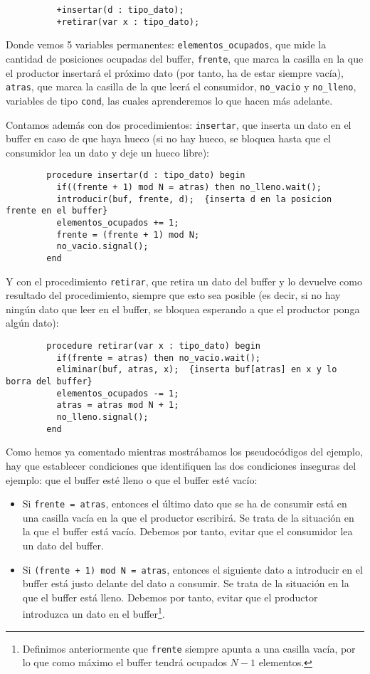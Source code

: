 \begin{ejemplo}
\begin{verbatim}
          +insertar(d : tipo_dato);
          +retirar(var x : tipo_dato);
    \end{verbatim}
    Donde vemos 5 variables permanentes: \verb|elementos_ocupados|, que mide la cantidad de posiciones ocupadas del buffer, \verb|frente|, que marca la casilla en la que el productor insertará el próximo dato (por tanto, ha de estar siempre vacía), \verb|atras|, que marca la casilla de la que leerá el consumidor, \verb|no_vacio| y \verb|no_lleno|, variables de tipo \verb|cond|, las cuales aprenderemos lo que hacen más adelante.
    
    Contamos además con dos procedimientos: \verb|insertar|, que inserta un dato en el buffer en caso de que haya hueco (si no hay hueco, se bloquea hasta que el consumidor lea un dato y deje un hueco libre):
    \begin{verbatim}
        procedure insertar(d : tipo_dato) begin
          if((frente + 1) mod N = atras) then no_lleno.wait();
          introducir(buf, frente, d);  {inserta d en la posicion frente en el buffer}
          elementos_ocupados += 1;
          frente = (frente + 1) mod N;
          no_vacio.signal();
        end
    \end{verbatim}
    Y con el procedimiento \verb|retirar|, que retira un dato del buffer y lo devuelve como resultado del procedimiento, siempre que esto sea posible (es decir, si no hay ningún dato que leer en el buffer, se bloquea esperando a que el productor ponga algún dato):
    \begin{verbatim}
        procedure retirar(var x : tipo_dato) begin
          if(frente = atras) then no_vacio.wait();
          eliminar(buf, atras, x);  {inserta buf[atras] en x y lo borra del buffer}
          elementos_ocupados -= 1;
          atras = atras mod N + 1;
          no_lleno.signal();
        end
    \end{verbatim}
    Como hemos ya comentado mientras mostrábamos los pseudocódigos del ejemplo, hay que establecer condiciones que identifiquen las dos condiciones inseguras del ejemplo: que el buffer esté lleno o que el buffer esté vacío:
    \begin{itemize}
        \item Si \verb|frente = atras|, entonces el último dato que se ha de consumir está en una casilla vacía en la que el productor escribirá. Se trata de la situación en la que el buffer está vacío. Debemos por tanto, evitar que el consumidor lea un dato del buffer.
        \item Si \verb|(frente + 1) mod N = atras|, entonces el siguiente dato a introducir en el buffer está justo delante del dato a consumir. Se trata de la situación en la que el buffer está lleno. Debemos por tanto, evitar que el productor introduzca un dato en el buffer\footnote{Definimos anteriormente que \texttt{frente} siempre apunta a una casilla vacía, por lo que como máximo el buffer tendrá ocupados $N-1$ elementos.}.

\end{itemize}
\end{ejemplo}
